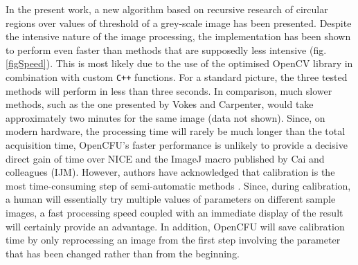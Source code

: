 \documentclass[10pt]{article}
\newcommand{\IJM}{IJM}
\begin{document}
In the present work, a new algorithm based on recursive research of circular
regions over values of threshold of a grey-scale image has been presented.
Despite the intensive nature of the image processing, the implementation has
been shown to perform even faster than methods that are supposedly less intensive
\cite{clarke_lowcost_2010,cai_optimized_2011} (fig.\ref{figSpeed}). This is most
likely due to the use of the optimised OpenCV library\cite{opencv_library} in
combination with custom \texttt{C++} functions.
For a standard picture, the three tested methods will perform in less than three
seconds. In comparison, much slower methods, such as the one presented by Vokes
and Carpenter\cite{vokes_using_2008}, would take approximately two minutes for
the same image (data not shown).
Since, on modern hardware, the processing time will rarely be much longer than
the total acquisition time, OpenCFU's faster performance is unlikely to provide
a decisive direct gain of time over NICE\cite{clarke_lowcost_2010} and
the ImageJ macro published by Cai
and colleagues (\IJM{})\cite{cai_optimized_2011}.
However, authors have acknowledged that calibration is the most time-consuming
step of semi-automatic methods \cite{vokes_using_2008,cai_optimized_2011}.
Since, during calibration, a human will essentially try multiple values of
parameters on different sample images, a fast processing speed coupled with an
immediate display of the result will certainly provide an advantage. In
addition, OpenCFU will save calibration time by only reprocessing an image from
the first step involving the parameter that has been changed rather than from
the beginning.
\end{document}
